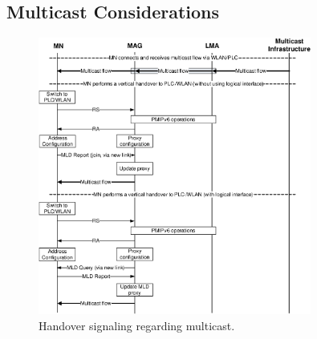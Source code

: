 \subsection{Multicast Considerations}
\begin{figure}[h!] 
  \begin{center} 
    \includegraphics[width=0.80\textwidth]{./Part2/Chapter6/figures/c8_handover_base.eps} 
    \caption[The multicast-related signaling when an EV changes its point of attachment.]{Handover signaling regarding multicast.}
    \label{fig:c8_handover_base}
  \end{center} 
\end{figure}
